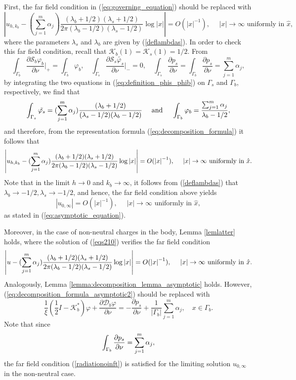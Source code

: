 First, the far field condition in (\ref{eq:governing_equation})
should be replaced with
\begin{equation} \label{eq:governing_equation_rad}
\left|u_{h,k_{b}} - (\sum_{j=1}^m \alpha_j)  \frac{(\lambda_b
+ 1/2) (\lambda_s + 1/2)}{2 \pi (\lambda_b -1/2) (\lambda_s -
1/2)} \log |x| \right|  = {O}(\left|x\right|^{-1}), \quad
\,\,\left|x\right|\rightarrow\infty \text{ uniformly in }\hat{x},
\end{equation}
where the parameters $\lambda_{s}$ and $\lambda_{b}$ are given by
(\ref{deflambdas}). In order to check this far field condition,
recall that $\mathcal{K}_b(1) = \mathcal{K}_s(1)=1/2$. From
$$
\int_{\Gamma_b}
\frac{\partial\mathcal{S}_{b}\varphi_{b}}{\partial\nu} \bigg |_{+}
= \int_{\Gamma_b} \varphi_b, \quad \int_{\Gamma_s}
\frac{\partial\mathcal{S}_{s}\tilde{\varphi_{s}}}{\partial\nu}
\bigg |_{-} = 0, \quad \int_{\Gamma_s} \frac{\partial p_s}{\partial
\nu} = \int_{\Gamma_b} \frac{\partial p_s}{\partial \nu} =
\sum_{j=1}^m \alpha_j,
$$
by integrating the two equations in
(\ref{eq:definition_phis_phib}) on $\Gamma_s$ and $\Gamma_b$,
respectively, we find that
$$
\int_{\Gamma_s} \tilde{\varphi_{s}} =  (\displaystyle \sum_{j=1}^m \alpha_j)
\frac{(\lambda_b + 1/2)}{(\lambda_s -1/2) (\lambda_b -1/2)} \quad
\mbox{ and } \quad \int_{\Gamma_b} {\varphi_{b}} =
\frac{\sum_{j=1}^m \alpha_j}{\lambda_b -1/2},
$$
and therefore, from the representation formula
(\ref{eq:decomposition_formula}) it follows that
$$\left|u_{h,k_{b}} - \displaystyle (\sum_{j=1}^m \alpha_j) \frac{(\lambda_b + 1/2) (\lambda_s +
1/2)}{2 \pi (\lambda_b -1/2) (\lambda_s - 1/2)} \log |x| \right| =
{O}(\left|x\right|^{-1}), \quad
\,\,\left|x\right|\rightarrow\infty \text{ uniformly in
}\hat{x}.$$ Note that in the limit $h\rightarrow 0$ and $k_b
\rightarrow \infty$,  it follows from (\ref{deflambdas}) that
$\lambda_b \rightarrow -1/2, \lambda_s \rightarrow -1/2$, and
hence, the far field condition above yields
\begin{equation} \label{radiationoinft}
\left|u_{0,\infty} \right| = {O}(\left|x\right|^{-1}), \quad
\,\,\left|x\right|\rightarrow\infty \text{ uniformly in }\hat{x},
\end{equation}
as stated in (\ref{eq:asymptotic_equation}).

Moreover, in the case of non-neutral charges in the body, Lemma
\ref{lemlatter} holds, where the solution of (\ref{eqs210})
verifies the far field condition
$$
\left|u - \displaystyle (\sum_{j=1}^m \alpha_j) \frac{(\lambda_b + 1/2)
(\lambda_s + 1/2)}{2 \pi (\lambda_b -1/2) (\lambda_s - 1/2)} \log
|x| \right| = {O}(\left|x\right|^{-1}), \quad
\, \, \left|x\right|\rightarrow\infty \text{ uniformly in }\hat{x}.
$$
Analogously, Lemma \ref{lemma:decomposition_lemma_asymptotic} holds.
However, (\ref{eq:decomposition_formula_asymptotic2}) should be
replaced with
$$
\frac{1}{\xi}\left(\frac{1}{2}I-\mathcal{K}_{b}^{*}\right)\varphi
+\frac{\partial\mathcal{D}_{b}\varphi}{\partial\nu}=-\frac{\partial
p_s}{\partial\nu} + \frac{1}{|\Gamma_b|} \sum_{j=1}^m \alpha_j,
\quad x \in \Gamma_b.
$$
Note that since $$\displaystyle \int_{\Gamma_b} \frac{\partial p_s}{\partial
\nu} = \sum_{j=1}^m \alpha_j,$$ the far field condition
(\ref{radiationoinft}) is satisfied for the limiting solution
$u_{0,\infty}$ in the non-neutral case.

